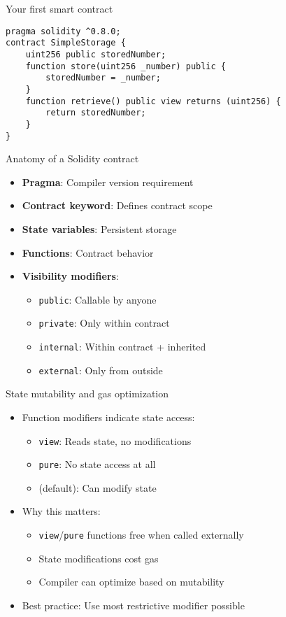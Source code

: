 \documentclass[aspectratio=169, lualatex, handout]{beamer}
\begin{document}
\begin{frame}[fragile]{Your first smart contract}
	\begin{verbatim}
pragma solidity ^0.8.0;
contract SimpleStorage {
    uint256 public storedNumber;
    function store(uint256 _number) public {
        storedNumber = _number;
    }
    function retrieve() public view returns (uint256) {
        return storedNumber;
    }
}
 \end{verbatim}
\end{frame}

\begin{frame}{Anatomy of a Solidity contract}
	\begin{itemize}
		\item \textbf{Pragma}: Compiler version requirement
		\item \textbf{Contract keyword}: Defines contract scope
		\item \textbf{State variables}: Persistent storage
		\item \textbf{Functions}: Contract behavior
		\item \textbf{Visibility modifiers}:
		      \begin{itemize}
			      \item \texttt{public}: Callable by anyone
			      \item \texttt{private}: Only within contract
			      \item \texttt{internal}: Within contract + inherited
			      \item \texttt{external}: Only from outside
		      \end{itemize}
	\end{itemize}
\end{frame}

\begin{frame}{State mutability and gas optimization}
	\begin{itemize}
		\item Function modifiers indicate state access:
		      \begin{itemize}
			      \item \texttt{view}: Reads state, no modifications
			      \item \texttt{pure}: No state access at all
			      \item (default): Can modify state
		      \end{itemize}
		\item Why this matters:
		      \begin{itemize}
			      \item \texttt{view}/\texttt{pure} functions free when called externally
			      \item State modifications cost gas
			      \item Compiler can optimize based on mutability
		      \end{itemize}
		\item Best practice: Use most restrictive modifier possible
	\end{itemize}
\end{frame}
\end{document}
